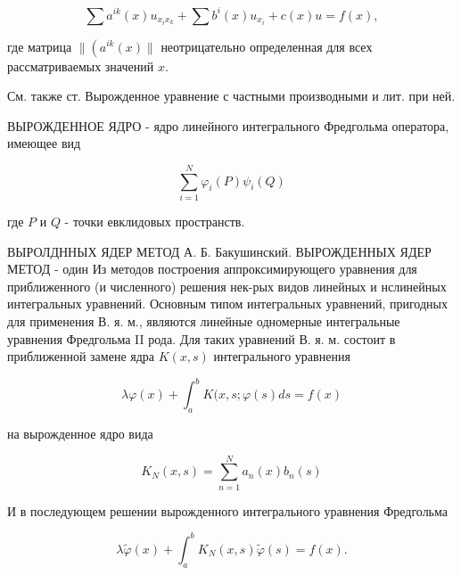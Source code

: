 \documentclass[10pt]{article}
\begin{document}
\[

\sum a^{i k}(x) u_{x_{i} x_{k}}+\sum b^{i}(x) u_{x_{i}}+c(x) u=f(x),

\]



где матрица $\|\left(a^{i k}(x) \|\right.$ неотрицательно определенная для всех рассматриваемых значений $x$.



См. также ст. Вырожденное уравнение с частными производными и лит. при ней.



ВЫРОЖДЕННОЕ ЯДРО - ядро линейного интегрального Фредгольма оператора, имеющее вид



\[

\sum_{i=1}^{N} \varphi_{i}(P) \psi_{i}(Q)

\]



где $P$ и $Q$ - точки евклидовых пространств.



ВЫРОЛДННЫХ ЯДЕР МЕТОД А. Б. Бакушинский. ВЫРОЖДЕННЫХ ЯДЕР МЕТОД - один Из методов построения аппроксимирующего уравнения для приближенного (и численного) решения нек-рых видов линейных и нслинейных интегральных уравнений. Основным типом интегральных уравнений, пригодных для применения В. я. м., являются линейные одномерные интегральные уравнения Фредгольма II рода. Для таких уравнений В. я. м. состоит в приближенной замене ядра $K(x, s)$ интегрального уравнения



\[

\lambda \varphi(x)+\int_{a}^{b} K(x, s ; \varphi(s) d s=f(x)

\]



на вырожденное ядро вида



\[

K_{N}(x, s)=\sum_{n=1}^{N} a_{n}(x) b_{n}(s)

\]



И в последующем решении вырожденного интегрального уравнения Фредгольма



\[

\lambda \tilde{\varphi}(x)+\int_{a}^{b} K_{N}(x, s) \tilde{\varphi}(s)=f(x) .

\]
\end{document}
